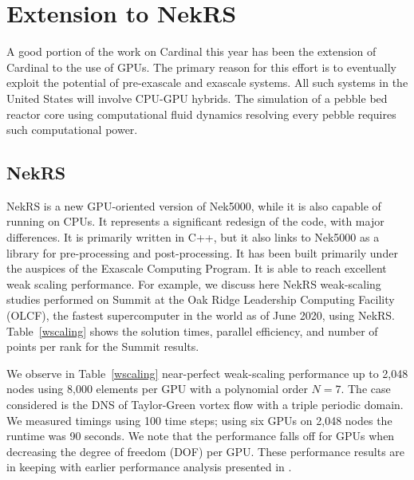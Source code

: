 \section{Extension to NekRS}
\label{s:nrs}

A good portion of the work on Cardinal this year has been the extension of Cardinal to the use of GPUs. The primary reason for this effort is to eventually exploit the potential of pre-exascale and exascale systems.
All such systems in the United States will involve CPU-GPU hybrids. The simulation of a pebble bed reactor core using computational fluid dynamics resolving every pebble requires such computational power.

\subsection{NekRS}

NekRS is a new GPU-oriented version of Nek5000, while it is also capable of running on CPUs. It represents a significant redesign of the code, with major differences. It is primarily written in C++, but it also links to Nek5000 as a library for pre-processing and post-processing. It has been built primarily under the auspices of the Exascale Computing Program. It is able to reach excellent weak scaling performance. For example, we discuss here NekRS weak-scaling studies performed on Summit at the Oak Ridge Leadership Computing Facility (OLCF), the fastest supercomputer in the world as of June 2020, using NekRS. Table~\ref{wscaling} shows the solution times, parallel efficiency, and number of points per rank for the Summit results.

We observe in Table~\ref{wscaling} near-perfect weak-scaling performance up to 2,048 nodes using 8,000 elements per GPU with a polynomial order  $N=7$. The case considered is the DNS of Taylor-Green vortex flow with a triple periodic domain. We measured timings using 100 time steps; using six GPUs on 2,048 nodes the runtime was 90 seconds. 
We note that the performance falls off for GPUs when decreasing the degree of freedom (DOF) per GPU.  
These performance results are in keeping with earlier performance analysis presented in \cite{fischer15,min2015a}.

